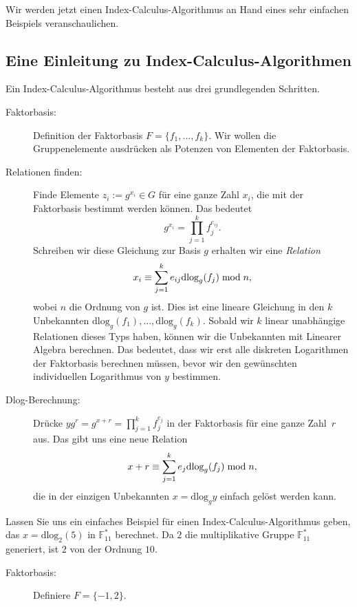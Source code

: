 \begin{refsegment}
Wir werden jetzt einen Index-Calculus-Algorithmus an Hand eines sehr einfachen Beispiels veranschaulichen.


\subsection{Eine Einleitung zu Index-Calculus-Algorithmen}
\label{simple}
Ein Index-Calculus-Algorithmus besteht aus drei grundlegenden Schritten.

\begin{description}
\item[Faktorbasis:] Definition der Faktorbasis $F=\{f_1, \ldots, f_k\}$. Wir wollen die Gruppenelemente ausdrücken als Potenzen von Elementen der Faktorbasis.

\item[Relationen finden:] Finde Elemente $z_i:=g^{x_i} \in G$ für eine ganze Zahl $x_i$, die mit der Faktorbasis bestimmt werden können. Das bedeutet
$$
  g^{x_i} = \prod_{j=1}^k f_j^{e_{ij}}.
$$
Schreiben wir diese Gleichung zur Basis $g$ erhalten wir eine {\em Relation}
$$
  x_i \equiv \sum_{j=1}^k e_{ij}\textrm{dlog}_g(f_j) \hspace{1mm}{\rm mod}\hspace{1mm} n,
$$
wobei $n$ die Ordnung von $g$ ist. Dies ist eine lineare Gleichung in den $k$ Unbekannten $\textrm{dlog}_g(f_1), \ldots, \textrm{dlog}_g(f_k)$. Sobald wir $k$ linear unabhängige Relationen dieses Typs haben, können wir die Unbekannten mit Linearer Algebra berechnen. Das bedeutet, dass wir erst alle diskreten Logarithmen der Faktorbasis berechnen müssen, bevor wir den gewünschten individuellen Logarithmus von $y$ bestimmen.

\item[Dlog-Berechnung:] Drücke $yg^r = g^{x+r} = \prod_{j=1}^k f_j^{e_j}$ in der Faktorbasis für eine ganze Zahl~$r$ aus.
Das gibt uns eine neue Relation
$$
  x+r \equiv \sum_{j=1}^k e_{j}\textrm{dlog}_g(f_j) \hspace{1mm}{\rm mod}\hspace{1mm} n,
$$
die in der einzigen Unbekannten $x=\textrm{dlog}_g y$ einfach gelöst werden kann.
\end{description}

Lassen Sie uns ein einfaches Beispiel für einen Index-Calculus-Algorithmus geben, das $x=\textrm{dlog}_2(5)$ in $\mathbb{F}_{11}^*$ berechnet. Da $2$ die multiplikative Gruppe $\mathbb{F}_{11}^*$ generiert, ist $2$ von der Ordnung $10$.

\begin{description}
\item[Faktorbasis:] Definiere $F=\{-1,2\}$.


\end{description}
\end{refsegment}
